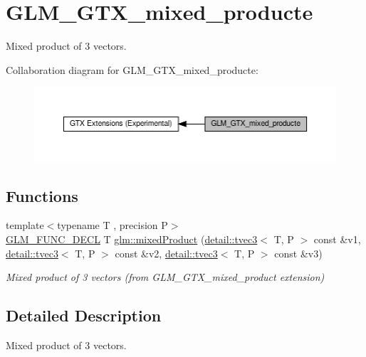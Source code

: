 \hypertarget{group__gtx__mixed__product}{}\section{G\+L\+M\+\_\+\+G\+T\+X\+\_\+mixed\+\_\+producte}
\label{group__gtx__mixed__product}


Mixed product of 3 vectors.  


Collaboration diagram for G\+L\+M\+\_\+\+G\+T\+X\+\_\+mixed\+\_\+producte\+:\nopagebreak
\begin{figure}[H]
\begin{center}
\leavevmode
\includegraphics[width=350pt]{group__gtx__mixed__product}
\end{center}
\end{figure}
\subsection*{Functions}
\begin{DoxyCompactItemize}
\item 
{\footnotesize template$<$typename T , precision P$>$ }\\\hyperlink{setup_8hpp_ab2d052de21a70539923e9bcbf6e83a51}{G\+L\+M\+\_\+\+F\+U\+N\+C\+\_\+\+D\+E\+CL} T \hyperlink{group__gtx__mixed__product_ga3c7ec94fdd2b088eac78fb4a0211f32d}{glm\+::mixed\+Product} (\hyperlink{structglm_1_1detail_1_1tvec3}{detail\+::tvec3}$<$ T, P $>$ const \&v1, \hyperlink{structglm_1_1detail_1_1tvec3}{detail\+::tvec3}$<$ T, P $>$ const \&v2, \hyperlink{structglm_1_1detail_1_1tvec3}{detail\+::tvec3}$<$ T, P $>$ const \&v3)
\begin{DoxyCompactList}\small\item\em Mixed product of 3 vectors (from G\+L\+M\+\_\+\+G\+T\+X\+\_\+mixed\+\_\+product extension) \end{DoxyCompactList}\end{DoxyCompactItemize}


\subsection{Detailed Description}
Mixed product of 3 vectors. 

